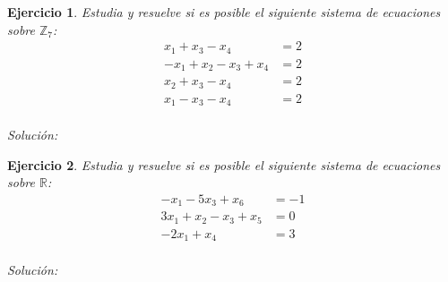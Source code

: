 \documentclass{amsart}
\newtheorem{ejer}{Ejercicio}
\def\r{\mathbb{R}}
\def\z{\mathbb{Z}}
\begin{document}


\begin{ejer} Estudia y resuelve si es posible el siguiente sistema de ecuaciones sobre $\z _7$:
\begin{align*}
x_{1} + x_{3} - x_{4} &= 2 \\
-x_{1} + x_{2} - x_{3} + x_{4} &= 2 \\
x_{2} + x_{3} - x_{4} &= 2 \\
x_{1} - x_{3} - x_{4} &= 2 \\
\end{align*}
\end{ejer}

{\it Soluci\'on:}



\begin{ejer} Estudia y resuelve si es posible el siguiente sistema de ecuaciones sobre $\r $:
\begin{align*}
-x_{1} - 5x_{3} + x_{6} &= -1 \\
3x_{1} + x_{2} - x_{3} + x_{5} &= 0 \\
-2x_{1} + x_{4} &= 3 \\
\end{align*}
\end{ejer}

{\it Soluci\'on:}


\end{document}
